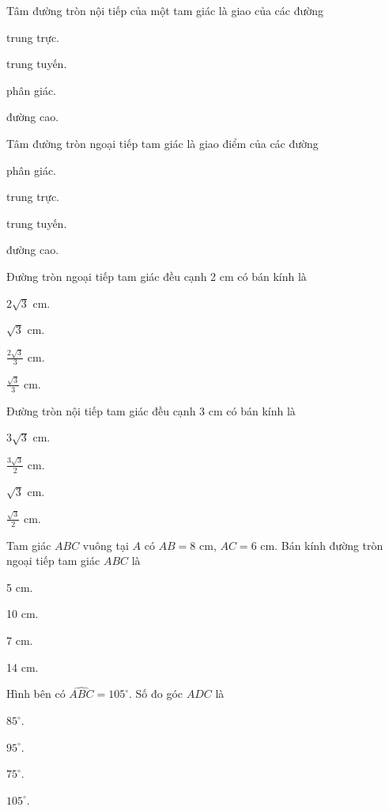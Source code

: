\documentclass[%
    fontsize=12pt,%
    chapterprefix=false,%
    open=right,%
    twoside=false,%
    numbers=noenddot,%
    headings=optiontohead,%
    final,%
    DIV=15,%
    parskip=half %
]{scrbook}
\begin{document}
\begin{tracnghiem}
\item Tâm đường tròn nội tiếp của một tam giác là giao của các đường
\begin{options}
  \item trung trực.
  \item trung tuyến.
  \item phân giác.
  \item đường cao.
\end{options}

\item Tâm đường tròn ngoại tiếp tam giác là giao điểm của các đường
\begin{options}
  \item phân giác.
  \item trung trực.
  \item trung tuyến.
  \item đường cao.
\end{options}

\item Đường tròn ngoại tiếp tam giác đều cạnh 2 cm có bán kính là
\begin{options}
  \item $2\sqrt{3}$ cm.
  \item $\sqrt{3}$ cm.
  \item $\frac{2\sqrt{3}}{3}$ cm.
  \item $\frac{\sqrt{3}}{3}$ cm.
\end{options}

\item Đường tròn nội tiếp tam giác đều cạnh 3 cm có bán kính là
\begin{options}
  \item $3\sqrt{3}$ cm.
  \item $\frac{3\sqrt{3}}{2}$ cm.
  \item $\sqrt{3}$ cm.
  \item $\frac{\sqrt{3}}{2}$ cm.
\end{options}

\item Tam giác $ABC$ vuông tại $A$ có $AB = 8$ cm, $AC = 6$ cm. Bán kính đường tròn ngoại tiếp tam giác $ABC$ là
\begin{options}
  \item 5 cm.
  \item 10 cm.
  \item 7 cm.
  \item 14 cm.
\end{options}

\item Hình bên có $\widehat{ABC} = 105^\circ$. Số đo góc $ADC$ là
\begin{options}
  \item $85^\circ$.
  \item $95^\circ$.
  \item $75^\circ$.
  \item $105^\circ$.
\end{options}


\end{tracnghiem}
\end{document}
